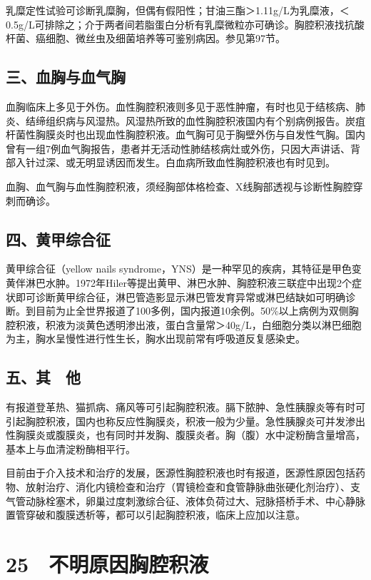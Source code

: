乳糜定性试验可诊断乳糜胸，但偶有假阳性；甘油三酯＞1.11g/L为乳糜液，＜0.5g/L可排除之；介于两者间若脂蛋白分析有乳糜微粒亦可确诊。胸腔积液找抗酸杆菌、癌细胞、微丝虫及细菌培养等可鉴别病因。参见第97节。

\subsection{三、血胸与血气胸}

血胸临床上多见于外伤。血性胸腔积液则多见于恶性肿瘤，有时也见于结核病、肺炎、结缔组织病与风湿热。风湿热所致的血性胸腔积液国内有个别病例报告。炭疽杆菌性胸膜炎时也出现血性胸腔积液。血气胸可见于胸壁外伤与自发性气胸。国内曾有一组7例血气胸报告，患者并无活动性肺结核病灶或外伤，只因大声讲话、背部入针过深、或无明显诱因而发生。白血病所致血性胸腔积液也有时见到。

血胸、血气胸与血性胸腔积液，须经胸部体格检查、X线胸部透视与诊断性胸腔穿刺而确诊。

\subsection{四、黄甲综合征}

黄甲综合征（yellow nails
syndrome，YNS）是一种罕见的疾病，其特征是甲色变黄伴淋巴水肿。1972年Hiler等提出黄甲、淋巴水肿、胸腔积液三联症中出现2个症状即可诊断黄甲综合征，淋巴管造影显示淋巴管发育异常或淋巴结缺如可明确诊断。到目前为止全世界报道了100多例，国内报道10余例。50\%以上病例为双侧胸腔积液，积液为淡黄色透明渗出液，蛋白含量常＞40g/L，白细胞分类以淋巴细胞为主，胸水呈慢性进行性生长，胸水出现前常有呼吸道反复感染史。

\subsection{五、其　他}

有报道登革热、猫抓病、痛风等可引起胸腔积液。膈下脓肿、急性胰腺炎等有时可引起胸腔积液，国内也称反应性胸膜炎，积液一般为少量。急性胰腺炎可并发渗出性胸膜炎或腹膜炎，也有同时并发胸、腹膜炎者。胸（腹）水中淀粉酶含量增高，基本上与血清淀粉酶相平行。

目前由于介入技术和治疗的发展，医源性胸腔积液也时有报道，医源性原因包括药物、放射治疗、消化内镜检查和治疗（胃镜检查和食管静脉曲张硬化剂治疗）、支气管动脉栓塞术，卵巢过度刺激综合征、液体负荷过大、冠脉搭桥手术、中心静脉置管穿破和腹膜透析等，都可以引起胸腔积液，临床上应加以注意。

\protect\hypertarget{text00077.html}{}{}

\section{25　不明原因胸腔积液}

